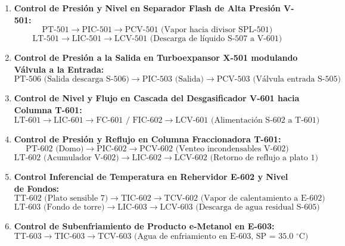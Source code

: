 \documentclass[10pt,letterpaper]{article}
\begin{document}
\begin{enumerate}
    \item \textbf{Control de Presión y Nivel en Separador Flash de Alta Presión V-501:}
    \begin{equation*}
        \text{PT-501} \longrightarrow \text{PIC-501} \longrightarrow \text{PCV-501 (Vapor hacia divisor SPL-501)}
    \end{equation*}
    \begin{equation*}
        \text{LT-501} \longrightarrow \text{LIC-501} \longrightarrow \text{LCV-501 (Descarga de líquido S-507 a V-601)}
    \end{equation*}

    \item \textbf{Control de Presión a la Salida en Turboexpansor X-501 modulando Válvula a la Entrada:}
    \begin{equation*}
        \text{PT-506 (Salida descarga S-506)} \longrightarrow \text{PIC-503 (Salida)} \longrightarrow \text{PCV-503 (Válvula entrada S-505)}
    \end{equation*}

    \item \textbf{Control de Nivel y Flujo en Cascada del Desgasificador V-601 hacia Columna T-601:}
    \begin{equation*}
        \text{LT-601} \longrightarrow \text{LIC-601} \longrightarrow \text{FC-601 / FIC-602} \longrightarrow \text{LCV-601 (Alimentación S-602 a T-601)}
    \end{equation*}

    \item \textbf{Control de Presión y Reflujo en Columna Fraccionadora T-601:}
    \begin{equation*}
        \text{PT-602 (Domo)} \longrightarrow \text{PIC-602} \longrightarrow \text{PCV-602 (Venteo incondensables V-602)}
    \end{equation*}
    \begin{equation*}
        \text{LT-602 (Acumulador V-602)} \longrightarrow \text{LIC-602} \longrightarrow \text{LCV-602 (Retorno de reflujo a plato 1)}
    \end{equation*}

    \item \textbf{Control Inferencial de Temperatura en Rehervidor E-602 y Nivel de Fondos:}
    \begin{equation*}
        \text{TT-602 (Plato sensible 7)} \longrightarrow \text{TIC-602} \longrightarrow \text{TCV-602 (Vapor de calentamiento a E-602)}
    \end{equation*}
    \begin{equation*}
        \text{LT-603 (Fondo de torre)} \longrightarrow \text{LIC-603} \longrightarrow \text{LCV-603 (Descarga de agua residual S-605)}
    \end{equation*}

    \item \textbf{Control de Subenfriamiento de Producto e-Metanol en E-603:}
    \begin{equation*}
        \text{TT-603} \longrightarrow \text{TIC-603} \longrightarrow \text{TCV-603 (Agua de enfriamiento en E-603, SP = 35.0 $^\circ$C)}
    \end{equation*}
\end{enumerate}
\end{document}
